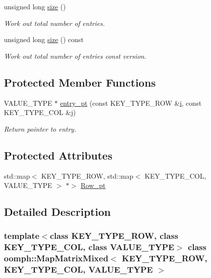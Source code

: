 \begin{DoxyCompactItemize}
unsigned long \hyperlink{classoomph_1_1MapMatrixMixed_af26d8be251e0d02354d242f84622c1ff}{size} ()
\begin{DoxyCompactList}\small\item\em Work out total number of entries. \end{DoxyCompactList}\item 
unsigned long \hyperlink{classoomph_1_1MapMatrixMixed_ae3f2f66dd90a57957c732a9ef1dd5197}{size} () const
\begin{DoxyCompactList}\small\item\em Work out total number of entries const version. \end{DoxyCompactList}\end{DoxyCompactItemize}
\subsection*{Protected Member Functions}
\begin{DoxyCompactItemize}
\item 
V\+A\+L\+U\+E\+\_\+\+T\+Y\+PE $\ast$ \hyperlink{classoomph_1_1MapMatrixMixed_a964536bfab6dc7426ddcdca07fe25d12}{entry\+\_\+pt} (const K\+E\+Y\+\_\+\+T\+Y\+P\+E\+\_\+\+R\+OW \&\hyperlink{cfortran_8h_adb50e893b86b3e55e751a42eab3cba82}{i}, const K\+E\+Y\+\_\+\+T\+Y\+P\+E\+\_\+\+C\+OL \&j)
\begin{DoxyCompactList}\small\item\em Return pointer to entry. \end{DoxyCompactList}\end{DoxyCompactItemize}
\subsection*{Protected Attributes}
\begin{DoxyCompactItemize}
\item 
std\+::map$<$ K\+E\+Y\+\_\+\+T\+Y\+P\+E\+\_\+\+R\+OW, std\+::map$<$ K\+E\+Y\+\_\+\+T\+Y\+P\+E\+\_\+\+C\+OL, V\+A\+L\+U\+E\+\_\+\+T\+Y\+PE $>$ $\ast$$>$ \hyperlink{classoomph_1_1MapMatrixMixed_a1ff123a221da0b158636e28782150e1e}{Row\+\_\+pt}
\end{DoxyCompactItemize}


\subsection{Detailed Description}
\subsubsection*{template$<$class K\+E\+Y\+\_\+\+T\+Y\+P\+E\+\_\+\+R\+OW, class K\+E\+Y\+\_\+\+T\+Y\+P\+E\+\_\+\+C\+OL, class V\+A\+L\+U\+E\+\_\+\+T\+Y\+PE$>$\newline
class oomph\+::\+Map\+Matrix\+Mixed$<$ K\+E\+Y\+\_\+\+T\+Y\+P\+E\+\_\+\+R\+O\+W, K\+E\+Y\+\_\+\+T\+Y\+P\+E\+\_\+\+C\+O\+L, V\+A\+L\+U\+E\+\_\+\+T\+Y\+P\+E $>$}

